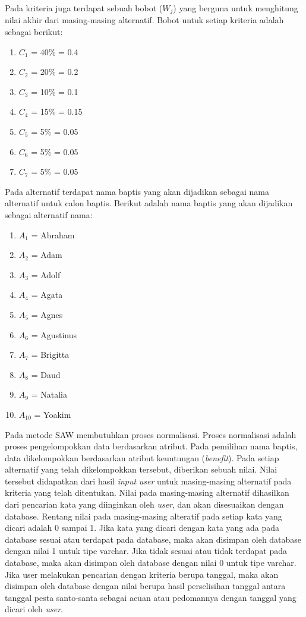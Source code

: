 Pada kriteria juga terdapat sebuah bobot ($W_{j}$) yang berguna untuk menghitung nilai akhir dari masing-masing alternatif. Bobot untuk setiap kriteria adalah sebagai berikut:

\begin{enumerate}
	\item $C_{1}$ = 40\% = 0.4
	\item $C_{2}$ = 20\% = 0.2
	\item $C_{3}$ = 10\% = 0.1
	\item $C_{4}$ = 15\% = 0.15
	\item $C_{5}$ = 5\% = 0.05
	\item $C_{6}$ = 5\% = 0.05
	\item $C_{7}$ = 5\% = 0.05
\end{enumerate}

Pada alternatif terdapat nama baptis yang akan dijadikan sebagai nama alternatif untuk calon baptis. Berikut adalah nama baptis yang akan dijadikan sebagai alternatif nama:

\begin{enumerate}
	\item $A_{1}$ = Abraham
	\item $A_{2}$ = Adam
	\item $A_{3}$ = Adolf
	\item $A_{4}$ = Agata
	\item $A_{5}$ = Agnes
	\item $A_{6}$ = Agustinus
	\item $A_{7}$ = Brigitta
	\item $A_{8}$ = Daud
	\item $A_{9}$ = Natalia
	\item $A_{10}$ = Yoakim
\end{enumerate}

Pada metode SAW membutuhkan proses normalisasi. Proses normalisasi adalah proses pengelompokkan data berdasarkan atribut. Pada pemilihan nama baptis, data dikelompokkan berdasarkan atribut keuntungan (\textit{benefit}). Pada setiap alternatif yang telah dikelompokkan tersebut,
diberikan sebuah nilai. Nilai tersebut didapatkan dari hasil \textit{input} \textit{user} untuk masing-masing alternatif pada
kriteria yang telah ditentukan. %
Nilai pada masing-masing alternatif dihasilkan dari pencarian kata yang diinginkan oleh \textit{user}, dan akan disesuaikan dengan database. Rentang nilai pada masing-masing alteratif pada setiap kata yang dicari adalah 0 sampai 1. Jika kata yang dicari dengan kata yang ada pada database sesuai atau terdapat pada database, maka akan disimpan oleh database dengan nilai 1 untuk tipe varchar. Jika tidak sesuai atau tidak terdapat pada database, maka akan disimpan oleh database dengan nilai 0 untuk tipe varchar. Jika user melakukan pencarian dengan kriteria berupa tanggal, maka akan disimpan oleh database dengan nilai berupa hasil perselisihan tanggal antara tanggal pesta santo-santa sebagai acuan atau pedomannya dengan tanggal yang dicari oleh \textit{user}. 

